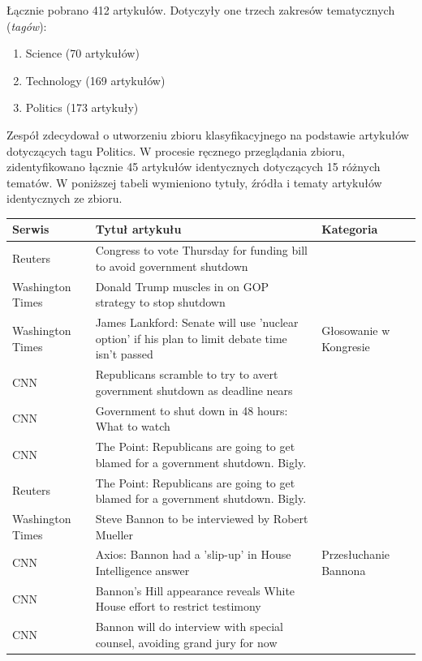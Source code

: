 Łącznie pobrano 412 artykułów. Dotyczyły one trzech zakresów tematycznych (\textit{tagów}):
\begin{enumerate}
	\item Science (70 artykułów)
	\item Technology (169 artykułów)
	\item Politics (173 artykuły)
\end{enumerate} 

Zespół zdecydował o utworzeniu zbioru klasyfikacyjnego na podstawie artykułów dotyczących tagu Politics. W procesie ręcznego przeglądania zbioru, zidentyfikowano łącznie 45 artykułów identycznych dotyczących 15 różnych tematów. W poniższej tabeli wymieniono tytuły, źródła i tematy artykułów identycznych ze zbioru.
 
\begin{center}
    \begin{longtable}{|p{}|p{}|p{}|}
    \hline
    Serwis & Tytuł artykułu & Kategoria \\ \hline
    Reuters & Congress to vote Thursday for funding bill to avoid government shutdown & \multirow{5}{*}{Głosowanie w Kongresie} \\
    Washington Times & Donald Trump muscles in on GOP strategy to stop shutdown & \\ 
    Washington Times & James Lankford: Senate will use 'nuclear option' if his plan to limit debate time isn't passed & \\
    CNN & Republicans scramble to try to avert government shutdown as deadline nears & \\
    CNN & Government to shut down in 48 hours: What to watch & \\
    CNN & The Point: Republicans are going to get blamed for a government shutdown. Bigly. & \\ \hline
    Reuters & The Point: Republicans are going to get blamed for a government shutdown. Bigly. & \multirow{7}{*}{Przesłuchanie Bannona} \\
    Washington Times & Steve Bannon to be interviewed by Robert Mueller
& \\
    CNN & Axios: Bannon had a 'slip-up' in House Intelligence answer
 & \\
    CNN & Bannon's Hill appearance reveals White House effort to restrict testimony
 & \\
    CNN & Bannon will do interview with special counsel, avoiding grand jury for now
 & \\

\end{longtable}
\end{center}
